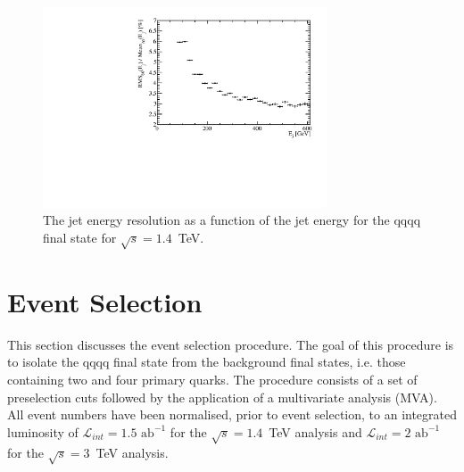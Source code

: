 \begin{figure}
\centering
\includegraphics[width=0.75\textwidth]{PhysicsAnalysis/Plots/JetEnergyResolution/JetEnergyResolutionScan_1400GeV.pdf}
\caption[The jet energy resolution as a function of the jet energy for the {\nu}{\nu}qqqq final state for $\sqrt{s}=1.4$~TeV.]{The jet energy resolution as a function of the jet energy for the {\nu}{\nu}qqqq final state for $\sqrt{s}=1.4$~TeV.}
\label{fig:jeteenrgyresolutionphysicsanalysis}
\end{figure}


\section{Event Selection}
\label{sec:eventselection}
This section discusses the event selection procedure.  The goal of this procedure is to isolate the \nu{\nu}qqqq final state from the background final states, i.e. those containing two and four primary quarks.  The procedure consists of a set of preselection cuts followed by the application of a multivariate analysis (MVA).  All event numbers  have been normalised, prior to event selection, to an integrated luminosity of $\mathcal{L}_{int} = 1.5\text{ ab}^{-1}$ for the $\sqrt{s} = 1.4$~TeV analysis and $\mathcal{L}_{int} = 2\text{ ab}^{-1}$  for the $\sqrt{s} = 3$~TeV analysis.  


